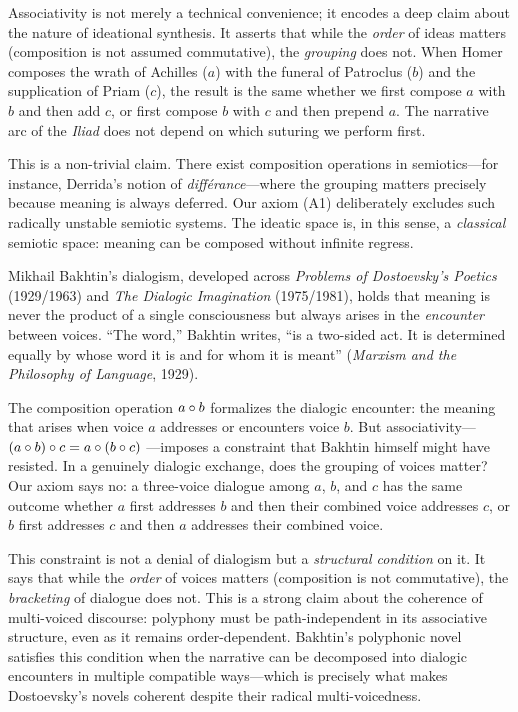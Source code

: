 \begin{interpretation}
Associativity is not merely a technical convenience; it encodes a deep claim
about the nature of ideational synthesis. It asserts that while the
\emph{order} of ideas matters (composition is not assumed commutative), the
\emph{grouping} does not. When Homer composes the wrath of Achilles ($a$)
with the funeral of Patroclus ($b$) and the supplication of Priam ($c$),
the result is the same whether we first compose $a$ with $b$ and then add
$c$, or first compose $b$ with $c$ and then prepend $a$. The narrative arc
of the \emph{Iliad} does not depend on which suturing we perform first.

This is a non-trivial claim. There exist composition operations in
semiotics---for instance, Derrida's notion of \emph{diff\'erance}---where
the grouping matters precisely because meaning is always deferred. Our
axiom (A1) deliberately excludes such radically unstable semiotic systems.
The ideatic space is, in this sense, a \emph{classical} semiotic space:
meaning can be composed without infinite regress.
\end{interpretation}

\begin{interpretation}\label{interp:ch1:bakhtin_dialogism}
Mikhail Bakhtin's dialogism, developed across \emph{Problems of
Dostoevsky's Poetics} (1929/1963) and \emph{The Dialogic Imagination}
(1975/1981), holds that meaning is never the product of a single
consciousness but always arises in the \emph{encounter} between voices.
``The word,'' Bakhtin writes, ``is a two-sided act. It is determined equally
by whose word it is and for whom it is meant'' (\emph{Marxism and the
Philosophy of Language}, 1929).

The composition operation $a \circ b$ formalizes the dialogic encounter:
the meaning that arises when voice $a$ addresses or encounters voice $b$.
But associativity---$(a \circ b) \circ c = a \circ (b \circ c)$
---imposes a constraint that Bakhtin himself might have resisted. In a
genuinely dialogic exchange, does the grouping of voices matter? Our axiom
says no: a three-voice dialogue among $a$, $b$, and $c$ has the same
outcome whether $a$ first addresses $b$ and then their combined voice
addresses $c$, or $b$ first addresses $c$ and then $a$ addresses their
combined voice.

This constraint is not a denial of dialogism but a \emph{structural
condition} on it. It says that while the \emph{order} of voices matters
(composition is not commutative), the \emph{bracketing} of dialogue does
not. This is a strong claim about the coherence of multi-voiced discourse:
polyphony must be path-independent in its associative structure, even as
it remains order-dependent. Bakhtin's polyphonic novel satisfies this
condition when the narrative can be decomposed into dialogic encounters
in multiple compatible ways---which is precisely what makes Dostoevsky's
novels coherent despite their radical multi-voicedness.
\end{interpretation}

